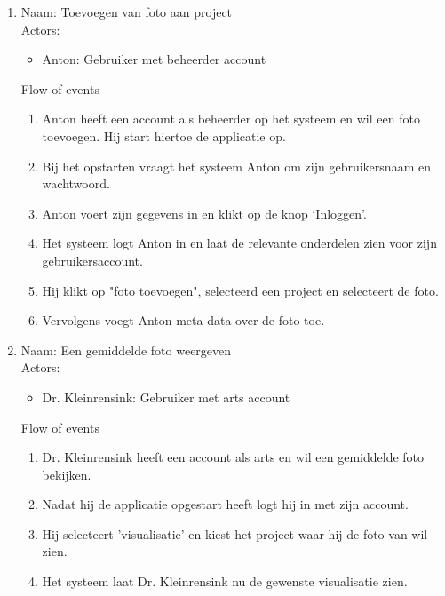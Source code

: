 \begin{enumerate}

\item   Naam: Toevoegen van foto aan project \\
	Actors:
	\begin{itemize}
		\item Anton: Gebruiker met beheerder account
	\end{itemize}
	Flow of events
	\begin{enumerate}
        \item Anton heeft een account als beheerder op het systeem en wil een foto toevoegen. Hij start hiertoe de applicatie op.
        \item Bij het opstarten vraagt het systeem Anton om zijn gebruikersnaam en wachtwoord.
        \item Anton voert zijn gegevens in en klikt op de knop `Inloggen'.
        \item Het systeem logt Anton in en laat de relevante onderdelen zien voor zijn gebruikersaccount.
	\item Hij klikt op "foto toevoegen", selecteerd een project en selecteert de foto.
	\item Vervolgens voegt Anton meta-data over de foto toe.
    \end{enumerate}

\item   Naam: Een gemiddelde foto weergeven \\
	Actors:
	\begin{itemize}
		\item Dr. Kleinrensink: Gebruiker met arts account
	\end{itemize}
	Flow of events
	\begin{enumerate}
	\item Dr. Kleinrensink heeft een account als arts en wil een gemiddelde foto bekijken.
	\item Nadat hij de applicatie opgestart heeft logt hij in met zijn account.
	\item Hij selecteert 'visualisatie' en kiest het project waar hij de foto van wil zien.
	\item Het systeem laat Dr. Kleinrensink nu de gewenste visualisatie zien.
	\end{enumerate}
\end{enumerate}

